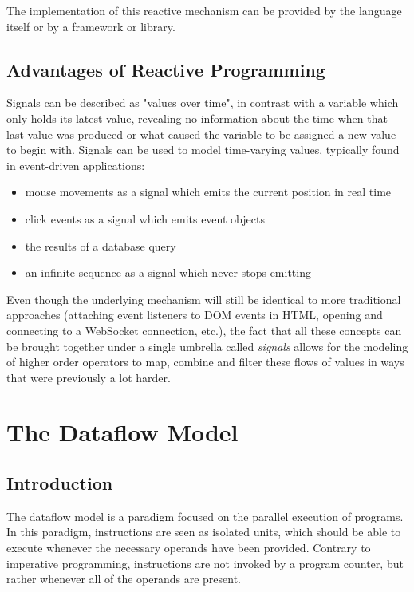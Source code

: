 The implementation of this reactive mechanism can be provided by the language itself or by a framework or library. 

\subsection{Advantages of Reactive Programming}

Signals can be described as "values over time", in contrast with a variable which only holds its latest value, revealing no information about the time when that last value was produced or what caused the variable to be assigned a new value to begin with. 
Signals can be used to model time-varying values, typically found in event-driven applications:
\begin{itemize}
	\item mouse movements as a signal which emits the current position in real time
	\item click events as a signal which emits event objects
	\item the results of a database query
    \item an infinite sequence as a signal which never stops emitting
\end{itemize}

Even though the underlying mechanism will still be identical to more traditional approaches (attaching event listeners to DOM events in HTML, opening and connecting to a WebSocket connection, etc.), the fact that all these concepts can be brought together under a single umbrella called \textit{signals} allows for the modeling of higher order operators to map, combine and filter these flows of values in ways that were previously a lot harder.

\newpage
\section{The Dataflow Model}

\subsection{Introduction}

The dataflow model \citep{johnston_advances_2004} is a paradigm focused on the parallel execution of programs. In this paradigm, instructions are seen as isolated units, which should be able to execute whenever the necessary operands have been provided. Contrary to imperative programming, instructions are not invoked by a program counter, but rather whenever all of the operands are present. 

